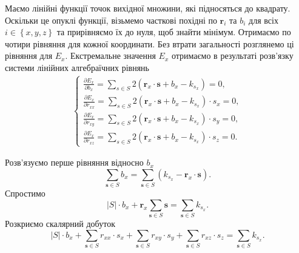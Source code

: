 Маємо лінійні функції точок вихідної множини, які підносяться до квадрату.
Оскільки це опуклі функції,
візьмемо часткові похідні по $\boldsymbol{r}_i$ та $b_i$ для всіх
$i \in \left\{ x, y, z \right\} $ та прирівняємо їх до нуля, щоб знайти мінімум.
Отримаємо по чотири рівняння для кожної координати.
Без втрати загальності розглянемо ці рівняння для $E_x$.
Екстремальне значення $E_x$
отримаємо в результаті розв'язку системи лінійних алгебраїчних рівнянь
\begin{gather*}
  \begin{cases}
    \frac{ \partial E_x}{ \partial b_x} =
    \sum \limits_{s \in S}
      2 \left( \boldsymbol{r}_x \cdot \boldsymbol{s} + b_x - k_{s_x} \right ) = 0, \\
    \frac{ \partial E_x}{ \partial r_{xx}} =
    \sum \limits_{s \in S}
      2 \left( \boldsymbol{r}_x \cdot \boldsymbol{s} + b_x - k_{s_x} \right ) \cdot s_x = 0, \\
    \frac{ \partial E_x}{ \partial r_{xy}} =
    \sum \limits_{s \in S}
      2 \left( \boldsymbol{r}_x \cdot \boldsymbol{s} + b_x - k_{s_x} \right ) \cdot s_y = 0, \\
    \frac{ \partial E_x}{ \partial r_{xz}} =
    \sum \limits_{s \in S}
      2 \left( \boldsymbol{r}_x \cdot \boldsymbol{s} + b_x - k_{s_x} \right ) \cdot s_z = 0.
  \end{cases}
\end{gather*}

Розв'язуємо перше рівняння відносно $b_x$
\begin{equation*}
  \sum \limits_{\boldsymbol{s} \in S} b_x =
  \sum \limits_{\boldsymbol{s} \in S} \left(k_{s_x} - \boldsymbol{r}_x \cdot \boldsymbol{s} \right ).
\end{equation*}
Спростимо
\begin{equation*}
  \left| S \right| \cdot b_x + \boldsymbol{r}_x \sum \limits_{\boldsymbol{s} \in S} \boldsymbol{s} =
  \sum \limits_{\boldsymbol{s} \in S} k_{s_x}.
\end{equation*}
Розкриємо скалярний добуток
\begin{equation*}
  \left| S \right| \cdot b_x + \sum \limits_{\boldsymbol{s} \in S} r_{xx} \cdot s_x +
  \sum \limits_{\boldsymbol{s} \in S} r_{xy} \cdot s_y +
  \sum \limits_{\boldsymbol{s} \in S} r_{xz} \cdot s_z  =
  \sum \limits_{\boldsymbol{s} \in S} k_{s_x}.
\end{equation*}

